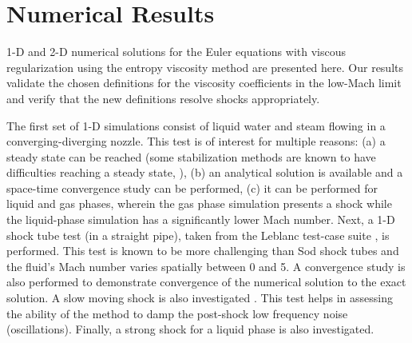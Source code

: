 \documentclass[preprint,10pt]{elsarticle}
\begin{document}
\section{Numerical Results} \label{sec:results}

1-D and 2-D numerical solutions for the Euler equations with viscous regularization using the entropy viscosity method are presented here.
Our results validate the chosen definitions for the viscosity coefficients in the low-Mach limit and verify that the new definitions resolve shocks appropriately. 

The first set of 1-D simulations consist of liquid water and steam flowing in a converging-diverging nozzle. This test is of interest for multiple reasons: (a) a steady state can be reached (some stabilization methods are known to have difficulties reaching a steady state, \cite{FluxLimiter, FluxLimiter2}), (b) an analytical solution is available and a space-time convergence study can be performed, (c) it can be performed for liquid and gas phases, wherein the gas phase simulation presents a shock while the liquid-phase simulation has a significantly lower Mach number.
%
Next, a 1-D shock tube test (in a straight pipe), taken from the Leblanc test-case suite \cite{Leblanc}, is performed. This test is known to be more challenging than Sod shock tubes and the fluid's Mach number varies spatially between 0 and 5. A convergence study is also performed to demonstrate convergence of the numerical solution to the exact solution. 
%
A slow moving shock is also investigated \cite{james}. This test helps in assessing the ability of the method to damp the post-shock low frequency noise (oscillations). 
%
Finally, a strong shock for a liquid phase is also investigated\cite{abgrall}.
\end{document}
